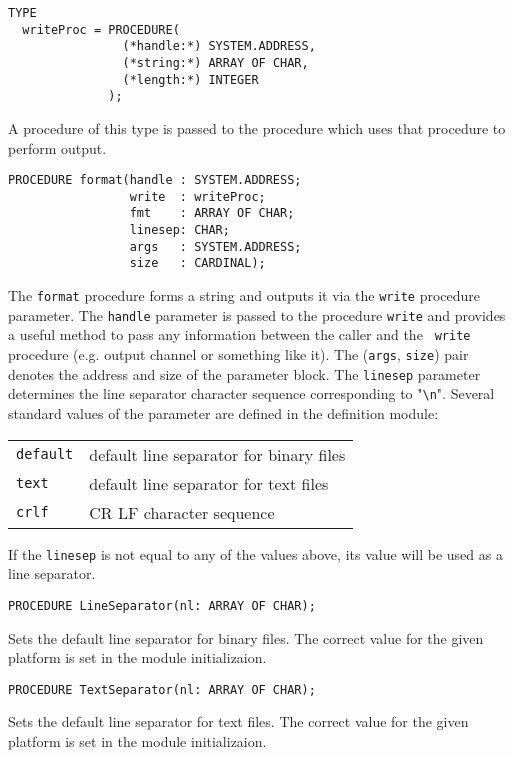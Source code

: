 {\samepage
{}
\begin{verbatim}
TYPE
  writeProc = PROCEDURE(
                (*handle:*) SYSTEM.ADDRESS,
                (*string:*) ARRAY OF CHAR,
                (*length:*) INTEGER
              );
\end{verbatim}
}
\ModuleList
A procedure of this type is passed to the  procedure
which uses that procedure to perform output.

{\samepage
{}
\begin{verbatim}
PROCEDURE format(handle : SYSTEM.ADDRESS;
                 write  : writeProc;
                 fmt    : ARRAY OF CHAR;
                 linesep: CHAR;
                 args   : SYSTEM.ADDRESS;
                 size   : CARDINAL);
\end{verbatim}
}
\ModuleList
The {\tt format} procedure forms a string and outputs it via the
{\tt write} procedure parameter. The {\tt handle} parameter is
passed to the procedure {\tt write} and provides a useful method
to pass any information between the caller and the {\tt
write} procedure (e.g. output channel or something like it).
The ({\tt args}, {\tt size}) pair denotes the address and
size of the parameter block.
The {\tt linesep} parameter determines the line separator character
sequence corresponding to "\verb|\n|". Several standard values of the
parameter are defined in the definition module:
\begin{flushleft}
\begin{tabular}{ll}
{\tt default} & default line separator for binary files \\
{\tt text}    & default line separator for text files   \\
{\tt crlf}    & CR LF character sequence                \\
\end{tabular}
\end{flushleft}
If the {\tt linesep} is not equal to any of the values above,
its value will be used as a line separator.

{\samepage
{}
\begin{verbatim}
PROCEDURE LineSeparator(nl: ARRAY OF CHAR);
\end{verbatim}
}
\ModuleList
Sets the default line separator for binary files.
The correct value for the given platform is set in the module
initializaion.

{\samepage
{}
\begin{verbatim}
PROCEDURE TextSeparator(nl: ARRAY OF CHAR);
\end{verbatim}
}
\ModuleList
Sets the default line separator for text files.
The correct value for the given platform is set in the module
initializaion.

